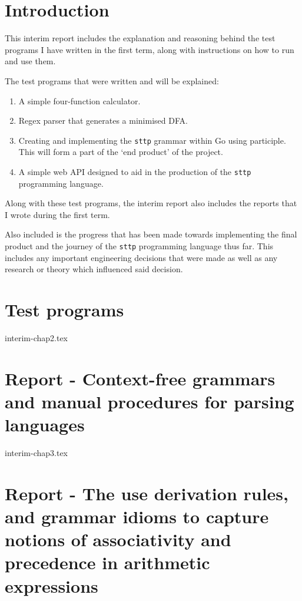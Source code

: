 \documentclass[]{interim}
\theoremstyle{definition}
\begin{document}
\chapter{Introduction}

This interim report includes the explanation and reasoning behind the test programs I have written in the first term, along with instructions on how to run and use them.

\begin{center}
    The test programs that were written and will be explained:
    \vspace{-1em}
    \begin{enumerate}
        \item A simple four-function calculator.
        \item Regex parser that generates a minimised DFA.
        \item Creating and implementing the \verb|sttp| grammar within Go using participle. This will form a part of the `end product' of the project.
        \item A simple web API designed to aid in the production of the \verb|sttp| programming language.
    \end{enumerate}
\end{center}

Along with these test programs, the interim report also includes the reports that I wrote during the first term.

Also included is the progress that has been made towards implementing the final product and the journey of the \verb|sttp| programming language thus far. This includes any important engineering decisions that were made as well as any research or theory which influenced said decision.

\chapter{Test programs}

{interim-chap2.tex}

\chapter{Report - Context-free grammars and manual procedures for parsing languages}

{interim-chap3.tex}

\chapter{Report - The use derivation rules, and grammar idioms to capture notions of associativity and precedence in arithmetic expressions}
\end{document}
